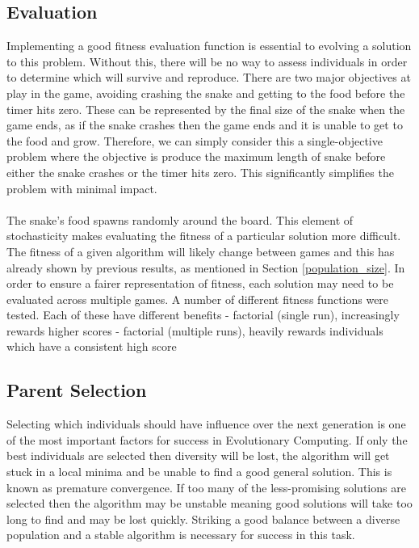 \documentclass{article}
\begin{document}
\subsection{Evaluation}
\label{fitness_evaluation}
Implementing a good fitness evaluation function is essential to evolving a solution to this problem. Without this, there will be no way to assess individuals in order to determine which will survive and reproduce. There are two major objectives at play in the game, avoiding crashing the snake and getting to the food before the timer hits zero. These can be represented by the final size of the snake when the game ends, as if the snake crashes then the game ends and it is unable to get to the food and grow. Therefore, we can simply consider this a single-objective problem where the objective is produce the maximum length of snake before either the snake crashes or the timer hits zero. This significantly simplifies the problem with minimal impact.
\\\\
The snake's food spawns randomly around the board. This element of stochasticity makes evaluating the fitness of a particular solution more difficult. The fitness of a given algorithm will likely change between games and this has already shown by previous results, as mentioned in Section \ref{population_size}. In order to ensure a fairer representation of fitness, each solution may need to be evaluated across multiple games.
A number of different fitness functions were tested.
Each of these have different benefits
- factorial (single run), increasingly rewards higher scores
- factorial (multiple runs), heavily rewards individuals which have a consistent high score

\subsection{Parent Selection}
Selecting which individuals should have influence over the next generation is one of the most important factors for success in Evolutionary Computing. If only the best individuals are selected then diversity will be lost, the algorithm will get stuck in a local minima and be unable to find a good general solution. This is known as premature convergence. If too many of the less-promising solutions are selected then the algorithm may be unstable meaning good solutions will take too long to find and may be lost quickly. Striking a good balance between a diverse population and a stable algorithm is necessary for success in this task.
\end{document}
